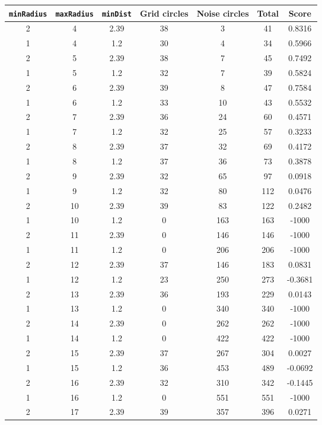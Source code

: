 \documentclass[letterpaper, 12pt]{article}
\begin{document}
\begin{longtable}{|c|c|c|c|c|c|c|}
\hline
\textbf{\texttt{minRadius}} & \textbf{\texttt{maxRadius}} & \textbf{\texttt{minDist}} & \textbf{Grid circles} & \textbf{Noise circles} & \textbf{Total} & \textbf{Score} \\
\hline
2 & 4 & 2.39 & 38 & 3 & 41 & 0.8316 \\
\hline
1 & 4 & 1.2 & 30 & 4 & 34 & 0.5966 \\
\hline
2 & 5 & 2.39 & 38 & 7 & 45 & 0.7492 \\
\hline
1 & 5 & 1.2 & 32 & 7 & 39 & 0.5824 \\
\hline
2 & 6 & 2.39 & 39 & 8 & 47 & 0.7584 \\
\hline
1 & 6 & 1.2 & 33 & 10 & 43 & 0.5532 \\
\hline
2 & 7 & 2.39 & 36 & 24 & 60 & 0.4571 \\
\hline
1 & 7 & 1.2 & 32 & 25 & 57 & 0.3233 \\
\hline
2 & 8 & 2.39 & 37 & 32 & 69 & 0.4172 \\
\hline
1 & 8 & 1.2 & 37 & 36 & 73 & 0.3878 \\
\hline
2 & 9 & 2.39 & 32 & 65 & 97 & 0.0918 \\
\hline
1 & 9 & 1.2 & 32 & 80 & 112 & 0.0476 \\
\hline
2 & 10 & 2.39 & 39 & 83 & 122 & 0.2482 \\
\hline
1 & 10 & 1.2 & 0 & 163 & 163 & -1000 \\
\hline
2 & 11 & 2.39 & 0 & 146 & 146 & -1000 \\
\hline
1 & 11 & 1.2 & 0 & 206 & 206 & -1000 \\
\hline
2 & 12 & 2.39 & 37 & 146 & 183 & 0.0831 \\
\hline
1 & 12 & 1.2 & 23 & 250 & 273 & -0.3681 \\
\hline
2 & 13 & 2.39 & 36 & 193 & 229 & 0.0143 \\
\hline
1 & 13 & 1.2 & 0 & 340 & 340 & -1000 \\
\hline
2 & 14 & 2.39 & 0 & 262 & 262 & -1000 \\
\hline
1 & 14 & 1.2 & 0 & 422 & 422 & -1000 \\
\hline
2 & 15 & 2.39 & 37 & 267 & 304 & 0.0027 \\
\hline
1 & 15 & 1.2 & 36 & 453 & 489 & -0.0692 \\
\hline
2 & 16 & 2.39 & 32 & 310 & 342 & -0.1445 \\
\hline
1 & 16 & 1.2 & 0 & 551 & 551 & -1000 \\
\hline
2 & 17 & 2.39 & 39 & 357 & 396 & 0.0271 \\

\end{longtable}
\end{document}
